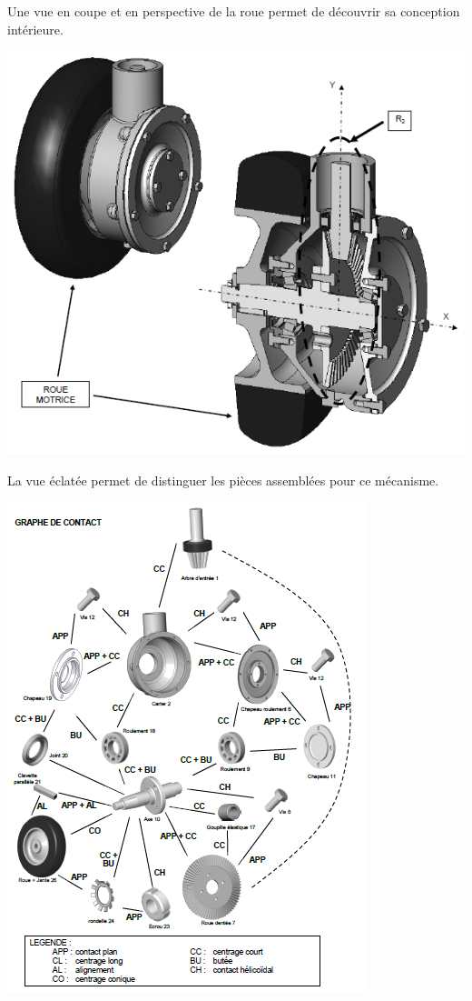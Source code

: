 Une vue en coupe et en perspective de la roue permet de découvrir sa conception intérieure.

\begin{center}
\includegraphics[width=0.8\linewidth]{img/roue1}
\end{center}

La vue éclatée permet de distinguer les pièces assemblées pour ce mécanisme.

\begin{center}
\includegraphics[width=\linewidth]{img/roue2}
\end{center}

